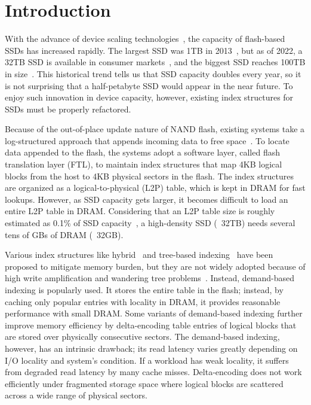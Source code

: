 \section{Introduction}
\label{sec:intro}

With the advance of device scaling technologies~\cite{3D-Nand,four-plane1}, the
capacity of flash-based SSDs has increased rapidly. The largest SSD was 1TB in
2013~\cite{1TB}, but as of 2022, a 32TB SSD is available in consumer
markets~\cite{32TB1,32TB2,32TB3}, and the biggest SSD reaches 100TB in
size~\cite{100TB}. This historical trend tells us that SSD capacity doubles
every year, so it is not surprising that a half-petabyte SSD would appear in
the near future. To enjoy such innovation in device capacity, however,
existing index structures for SSDs must be properly refactored.  

Because of the out-of-place update nature of NAND flash, existing
systems take a log-structured approach that appends incoming data to free
space~\cite{FTL-basic,flash-based-ssd}.  To locate data appended to the flash, the systems 
adopt a software layer, called flash translation layer (FTL), to maintain index structures that map 4KB logical blocks from the host to 4KB physical sectors in the flash.
The index structures are organized as a
logical-to-physical (L2P) table, which is kept in DRAM for fast lookups.
However, as SSD capacity gets larger, it becomes difficult to load an entire L2P table 
in DRAM. Considering that an L2P table size is roughly estimated as
0.1\% of SSD capacity~\cite{pink, dftl}, a high-density SSD (\eg~32TB) needs several
tens of GBs of DRAM (\eg~32GB).

Various index structures like hybrid~\cite{ superblockFTL, last, fast} and tree-based
indexing~\cite{uftl,utree} have been proposed to mitigate memory burden, but
they are not widely adopted because of high write amplification and wandering
tree problems~\cite{wandering-f2fs,wandering-b+}.  Instead, demand-based indexing is popularly
used.  It stores the entire table in the flash; instead, by caching only
popular entries with locality in DRAM, it provides reasonable performance with
small DRAM.  Some variants of demand-based indexing further improve memory
efficiency by delta-encoding table entries of logical blocks that are stored
over physically consecutive sectors.  The demand-based indexing, however, has
an intrinsic drawback; its read latency varies greatly depending on I/O
locality and system's condition.  If a workload has weak locality, it suffers
from degraded read latency by many cache misses.  Delta-encoding does not work
efficiently under fragmented storage space where logical blocks are scattered
across a wide range of physical sectors.

